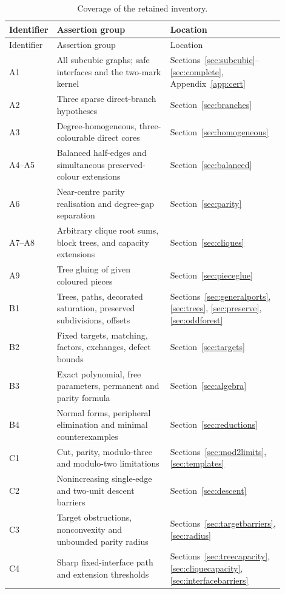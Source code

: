 \begin{longtable}{>{\raggedright\arraybackslash}p{0.10\linewidth}>{\raggedright\arraybackslash}p{0.53\linewidth}>{\raggedright\arraybackslash}p{0.27\linewidth}}
\caption{Coverage of the retained inventory.}\label{tab:coverage}\\
\toprule Identifier&Assertion group&Location\\\midrule\endfirsthead
\toprule Identifier&Assertion group&Location\\\midrule\endhead
A1&All subcubic graphs; safe interfaces and the two-mark kernel&
Sections~\ref{sec:subcubic}--\ref{sec:complete}, Appendix~\ref{app:cert}\\
A2&Three sparse direct-branch hypotheses&Section~\ref{sec:branches}\\
A3&Degree-homogeneous, three-colourable direct cores&Section~\ref{sec:homogeneous}\\
A4--A5&Balanced half-edges and simultaneous preserved-colour extensions&Section~\ref{sec:balanced}\\
A6&Near-centre parity realisation and degree-gap separation&Section~\ref{sec:parity}\\
A7--A8&Arbitrary clique root sums, block trees, and capacity extensions&Section~\ref{sec:cliques}\\
A9&Tree gluing of given coloured pieces&Section~\ref{sec:pieceglue}\\
B1&Trees, paths, decorated saturation, preserved subdivisions, offsets&Sections~\ref{sec:generalports}, \ref{sec:trees}, \ref{sec:preserve}, \ref{sec:oddforest}\\
B2&Fixed targets, matching, factors, exchanges, defect bounds&Section~\ref{sec:targets}\\
B3&Exact polynomial, free parameters, permanent and parity formula&Section~\ref{sec:algebra}\\
B4&Normal forms, peripheral elimination and minimal counterexamples&Section~\ref{sec:reductions}\\
C1&Cut, parity, modulo-three and modulo-two limitations&Sections~\ref{sec:mod2limits}, \ref{sec:templates}\\
C2&Nonincreasing single-edge and two-unit descent barriers&Section~\ref{sec:descent}\\
C3&Target obstructions, nonconvexity and unbounded parity radius&Sections~\ref{sec:targetbarriers}, \ref{sec:radius}\\
C4&Sharp fixed-interface path and extension thresholds&Sections~\ref{sec:treecapacity}, \ref{sec:cliquecapacity}, \ref{sec:interfacebarriers}\\

\end{longtable}
